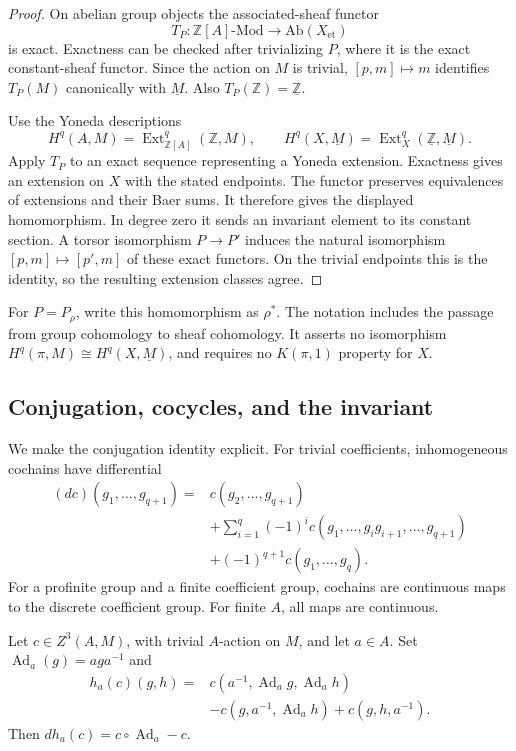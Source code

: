 \begin{proof}
On abelian group objects the associated-sheaf functor
\[
 T_P:\mathbb Z[A]\text{-}\mathrm{Mod}
       \longrightarrow\mathrm{Ab}(X_{\mathrm{et}})
\]
is exact.  Exactness can be checked after trivializing \(P\), where
it is the exact constant-sheaf functor.  Since the action on \(M\) is
trivial, \([p,m]\mapsto m\) identifies \(T_P(M)\) canonically with
\(\underline M\).  Also \(T_P(\mathbb Z)=\underline{\mathbb Z}\).

Use the Yoneda descriptions
\[
 H^q(A,M)=\operatorname{Ext}^q_{\mathbb Z[A]}(\mathbb Z,M),
 \qquad
 H^q(X,\underline M)=
 \operatorname{Ext}^q_{X}(\underline{\mathbb Z},\underline M).
\]
Apply \(T_P\) to an exact sequence representing a Yoneda extension.
Exactness gives an extension on \(X\) with the stated endpoints.
The functor preserves equivalences of extensions and their Baer sums.
It therefore gives the displayed homomorphism.  In degree zero it sends
an invariant element to its constant section.
A torsor isomorphism \(P\to P'\) induces the natural isomorphism
\([p,m]\mapsto[p',m]\) of these exact functors.  On the trivial
endpoints this is the identity, so the resulting extension classes agree.
\end{proof}

For \(P=P_\rho\), write this homomorphism as \(\rho^*\).
The notation includes the passage from group cohomology to sheaf
cohomology.  It asserts no isomorphism
\(H^q(\pi,M)\cong H^q(X,\underline M)\), and requires no
\(K(\pi,1)\) property for \(X\).

\subsection{Conjugation, cocycles, and the invariant}

We make the conjugation identity explicit.  For trivial coefficients,
inhomogeneous cochains have differential
\[
\begin{split}
 (dc)(g_1,\ldots,g_{q+1})={}&c(g_2,\ldots,g_{q+1})\\
 &+\sum_{i=1}^{q}(-1)^i
       c(g_1,\ldots,g_i g_{i+1},\ldots,g_{q+1})\\
 &+(-1)^{q+1}c(g_1,\ldots,g_q).
\end{split}
\]
For a profinite group and a finite coefficient group, cochains are
continuous maps to the discrete coefficient group.  For finite \(A\),
all maps are continuous.

\begin{lemma}
\label{lem:do26-conjugation}
Let \(c\in Z^3(A,M)\), with trivial \(A\)-action on \(M\), and
let \(a\in A\).  Set \(\operatorname{Ad}_a(g)=aga^{-1}\) and
\[
\begin{split}
 h_a(c)(g,h)={}&c(a^{-1},\operatorname{Ad}_a g,
                         \operatorname{Ad}_a h)\\
              &-c(g,a^{-1},\operatorname{Ad}_a h)
                +c(g,h,a^{-1}).
\end{split}
\]
Then \(d h_a(c)=c\circ\operatorname{Ad}_a-c\).
\end{lemma}

